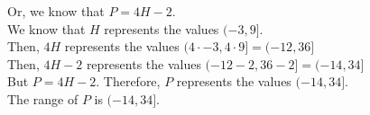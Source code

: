 \documentclass{ximera}
\begin{document}
Or, we know that $P = 4 H - 2$. \\



We know that $H$ represents the values $(-3, 9]$. \\


Then, $4 H$ represents the values $(4 \cdot -3, 4 \cdot 9] = (-12, 36]$ \\



Then, $4 H - 2$ represents the values $(-12 - 2, 36 - 2] = (-14, 34]$ \\


But $P = 4 H - 2$.  Therefore, $P$ represents the values $(-14, 34]$. \\


The range of $P$ is $(-14, 34]$.
\end{document}
